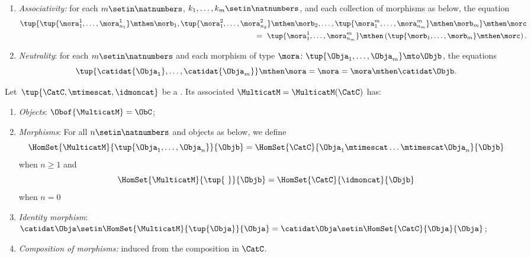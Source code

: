 \begin{ctdefinition}[Multicategory]
\begin{enumerate}
        \item \emph{Associativity:} for each $m \setin \natnumbers$, $k_1, \dots, k_m \setin \natnumbers$, and each collection of morphisms as below, the equation
              \begin{equation}
                  \begin{aligned}
                       \tup{ \tup{\mora_{1}^1,\ldots, \mora_{n_1}^1} \mthen \morb_1, \tup{\mora_{1}^2,\ldots, \mora_{n_2}^2 }\mthen \morb_2,\ldots, \tup{ \mora_{1}^m,\ldots, \mora_{n_m}^m } \mthen \morb_m } \mthen \morc \\ = \ \tup{ \mora_{1}^1,\ldots, \mora_{n_m}^m } \mthen \left ( \tup{ \morb_{1},\ldots, \morb_{m} } \mthen \morc \right ).
                  \end{aligned}
              \end{equation}
        \item \emph{Neutrality}: for each $m \setin \natnumbers$ and each morphism of type $\mora \colon \tup{\Obja_1,\ldots,\Obja_m}\mto \Objb$, the equations
              \begin{equation}
                  \tup{\catidat{\Obja_1},\ldots, \catidat{\Obja_m}}
                  \mthen \mora = \mora = \mora \mthen \catidat\Objb.
              \end{equation}
    \end{enumerate}
\end{ctdefinition}


\begin{ctdefinition}
        \label{def:multicat_from_monoidal}
        Let~$\tup{\CatC, \mtimescat, \idmoncat}$ be a .
        Its associated  $\MulticatM = \MulticatM(\CatC)$ has:
        \begin{enumerate}
            \item \emph{Objects}: $\Obof{\MulticatM}=\ObC$;
            \item \emph{Morphisms}: For all $n \setin \natnumbers$ and objects as below, we define 
            $$\HomSet{\MulticatM}{\tup{\Obja_1,\ldots,\Obja_n}}{\Objb}=\HomSet{\CatC}{\Obja_1 \mtimescat \ldots \mtimescat \Obja_n}{\Objb}$$ when $n \geq 1$ and 
            $$\HomSet{\MulticatM}{\tup{ \ }}{\Objb} = \HomSet{\CatC}{\idmoncat}{\Objb} $$ 
            when $n=0$
            \item \emph{Identity morphism}: $\catidat\Obja \setin \HomSet{\MulticatM}{\tup{\Obja}}{\Obja}=\catidat\Obja \setin \HomSet{\CatC}{\Obja}{\Obja}$;
            \item \emph{Composition of morphisms:} induced from the composition in $\CatC$. 
        \end{enumerate}
\end{ctdefinition}


